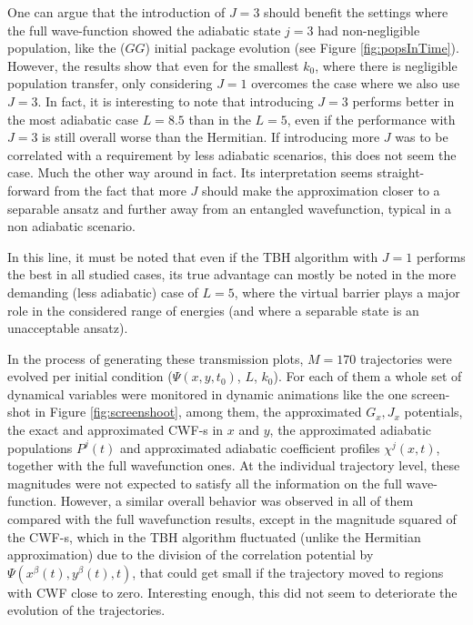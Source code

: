 \documentclass[11pt, a4paper]{article} %
\begin{document}
One can argue that the introduction of $J=3$ should benefit the settings where the full wave-function showed the adiabatic state $j=3$ had non-negligible population, like the ($GG$) initial package evolution (see Figure \ref{fig:popsInTime}). However, the results show that even for the smallest $k_0$, where there is negligible population transfer, only considering $J=1$ overcomes the case where we also use $J=3$. In fact, it is interesting to note that introducing $J=3$ performs better in the most adiabatic case $L=8.5$ than in the $L=5$, even if the performance with $J=3$ is still overall worse than the Hermitian. If introducing more $J$ was to be correlated with a requirement by less adiabatic scenarios, this does not seem the case. Much the other way around in fact. Its interpretation seems straight-forward from the fact that more $J$ should make the approximation closer to a separable ansatz and further away from an entangled wavefunction, typical in a non adiabatic scenario.\vspace{-0.1cm}

In this line, it must be noted that even if the TBH algorithm with $J=1$ performs the best in all studied cases, its true advantage can mostly be noted in the more demanding (less adiabatic) case of $L=5$, where the virtual barrier plays a major role in the considered range of energies (and where a separable state is an unacceptable ansatz).\vspace{-0.1cm}

In the process of generating these transmission plots, $M=170$ trajectories were evolved per initial condition ($\Psi(x,y,t_0)$, $L$, $k_0$). For each of them a whole set of dynamical variables  were monitored in dynamic animations like the one screen-shot in Figure \ref{fig:screenshoot}, among them, the approximated $G_x,J_x$ potentials, the exact and approximated CWF-s in $x$ and $y$, the approximated adiabatic populations $P^j(t)$ and approximated adiabatic coefficient profiles $\chi^j(x,t)$, together with the full wavefunction ones. At the individual trajectory level, these magnitudes were not expected to satisfy all the information on the full wave-function. However, a similar overall behavior was observed in all of them compared with the full wavefunction results, except in the magnitude squared of the CWF-s, which in the TBH algorithm fluctuated (unlike the Hermitian approximation) due to the division of the correlation potential by $\Psi(x^\beta(t), y^\beta(t),t)$, that could get small if the trajectory moved to regions with CWF close to zero. Interesting enough, this did not seem to deteriorate the evolution of the trajectories. 
\end{document}
